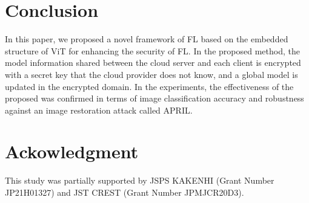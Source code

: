 \documentclass[conference, a4paper]{IEEEtran}
\begin{document}
\section{Conclusion}
In this paper, we proposed a novel framework of FL based on the embedded structure of ViT for enhancing the security of FL. In the proposed method, the model information shared between the cloud server and each client is encrypted with a secret key that the cloud provider does not know, and a global model is updated in the encrypted domain. In the experiments, the effectiveness of the proposed was confirmed in terms of image classification accuracy and robustness against an image restoration attack called APRIL.

\section*{Ackowledgment}
This study was partially supported by JSPS KAKENHI (Grant Number JP21H01327) and JST CREST (Grant Number JPMJCR20D3).



\vspace{12pt}
\end{document}
